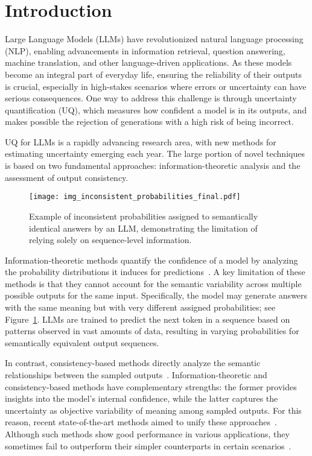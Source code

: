 
\section{Introduction}
\label{sec:intro}
  Large Language Models (LLMs) have revolutionized natural language processing (NLP), enabling advancements in information retrieval, question answering, machine translation, and other language-driven applications. As these models become an integral part of everyday life, ensuring the reliability of their outputs is crucial, especially in high-stakes scenarios where errors or uncertainty can have serious consequences. One way to address this challenge is through uncertainty quantification (UQ), which measures how confident a model is in its outputs, and makes possible the rejection of generations with a high risk of being incorrect.

  UQ for LLMs is a rapidly advancing research area, with new methods for estimating uncertainty emerging each year. The large portion of novel techniques is based on two fundamental approaches: information-theoretic analysis and the assessment of output consistency.

  \begin{figure}[t!]
    \centering
    \texttt{[image: img\_inconsistent\_probabilities\_final.pdf]}
    \caption{Example of inconsistent probabilities assigned to semantically identical answers by an LLM, demonstrating the limitation of relying solely on sequence-level information.}
  \label{fig:inconsistent_probability}
  \end{figure}
  
  Information-theoretic methods quantify the confidence of a model by analyzing the probability distributions it induces for predictions~\citep{malinin2020uncertainty, fomicheva-etal-2020-unsupervised}. A key limitation of these methods is that they cannot account for the semantic variability across multiple possible outputs for the same input. Specifically, the model may generate answers with the same meaning but with very different assigned probabilities; see Figure~\ref{fig:inconsistent_probability}. LLMs are trained to predict the next token in a sequence based on patterns observed in vast amounts of data, resulting in varying probabilities for semantically equivalent output sequences.
 
  In contrast, consistency-based methods directly analyze the semantic relationships between the sampled outputs~\citep{lin2023generating, fomicheva-etal-2020-unsupervised}. Information-theoretic and consistency-based methods have complementary strengths: the former provides insights into the model's internal confidence, while the latter captures the uncertainty as objective variability of meaning among sampled outputs. For this reason, recent state-of-the-art methods aimed to unify these approaches~\citep{kuhn2023semantic, duan-etal-2024-shifting}. Although such methods show good performance in various applications, they sometimes fail to outperform their simpler counterparts in certain scenarios~\citep{vashurin2024benchmarkinguncertaintyquantificationmethods}.

